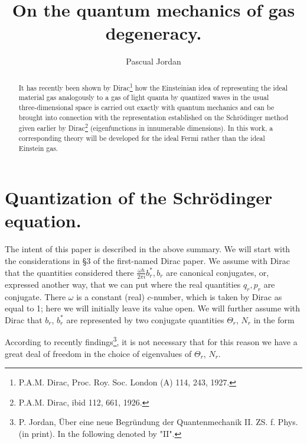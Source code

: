\begin{paper}{1}
\begin{header}
\title{On the quantum mechanics of gas degeneracy.}
\author{Pascual Jordan}
\makeheader
\end{header}

\begin{abstract}
It has recently been shown by Dirac\footnote{P.A.M. Dirac, Proc. Roy. Soc. London (A) 114, 243, 1927.} how the Einsteinian idea of representing the ideal material gas analogously to a gas of light quanta by quantized waves in the usual three-dimensional space is carried out exactly with quantum mechanics and can be brought into connection with the representation established on the Schrödinger method given earlier by Dirac\footnote{P.A.M. Dirac, ibid 112, 661, 1926.} (eigenfunctions in innumerable dimensions). In this work, a corresponding theory will be developed for the ideal Fermi rather than the ideal Einstein gas.
\end{abstract}

\section{Quantization of the Schrödinger equation.} The intent of this paper is described in the above summary. We will start with the considerations in \S3 of the first-named Dirac paper. We assume with Dirac that the quantities considered there $\frac{\omega h}{2\pi i}b_r^*, b_r$ are canonical conjugates, or, expressed another way, that we can put
where the real quantities $q_r,p_r$ are conjugate. There $\omega$ is a constant (real) $c$-number, which is taken by Dirac as equal to 1; here we will initially leave its value open. We will further assume with Dirac that $b_r$, $b_r^*$ are represented by two conjugate quantities $\Theta_r$, $N_r$ in the form 

According to recently findings\footnote{P. Jordan, Über eine neue Begründung der Quantenmechanik II. ZS. f. Phys. (in print). In the following denoted by "II".}, it is not necessary that
for this reason we have a great deal of freedom in the choice of eigenvalues of $\Theta_r$, $N_r$.


\end{paper}
